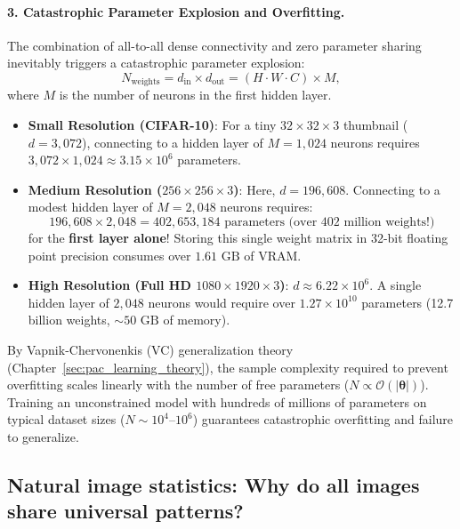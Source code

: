 \paragraph{3. Catastrophic Parameter Explosion and Overfitting.}
The combination of all-to-all dense connectivity and zero parameter sharing inevitably triggers a catastrophic parameter explosion:
\begin{equation}
N_{\text{weights}} = d_{\text{in}} \times d_{\text{out}} = (H \cdot W \cdot C) \times M,
\end{equation}
where $M$ is the number of neurons in the first hidden layer.
\begin{itemize}[noitemsep]
  \item \textbf{Small Resolution (CIFAR-10)}: For a tiny $32 \times 32 \times 3$ thumbnail ($d = 3,072$), connecting to a hidden layer of $M = 1,024$ neurons requires $3,072 \times 1,024 \approx 3.15 \times 10^6$ parameters.
  \item \textbf{Medium Resolution ($256 \times 256 \times 3$)}: Here, $d = 196,608$. Connecting to a modest hidden layer of $M = 2,048$ neurons requires:
    \begin{equation}
    196,608 \times 2,048 = 402,653,184 \text{ parameters (over } 402 \text{ million weights!)}
    \end{equation}
    for the \textbf{first layer alone}! Storing this single weight matrix in 32-bit floating point precision consumes over $1.61\text{ GB}$ of VRAM.
  \item \textbf{High Resolution (Full HD $1080 \times 1920 \times 3$)}: $d \approx 6.22 \times 10^6$. A single hidden layer of $2,048$ neurons would require over $1.27 \times 10^{10}$ parameters (12.7 billion weights, $\sim 50\text{ GB}$ of memory).
\end{itemize}
By Vapnik-Chervonenkis (VC) generalization theory (Chapter~\ref{sec:pac_learning_theory}), the sample complexity required to prevent overfitting scales linearly with the number of free parameters ($N \propto \mathcal{O}(|\boldsymbol{\theta}|)$). Training an unconstrained model with hundreds of millions of parameters on typical dataset sizes ($N \sim 10^4$--$10^6$) guarantees catastrophic overfitting and failure to generalize.

\subsection{Natural image statistics: Why do all images share universal patterns?}
\label{sec:natural_image_statistics}

